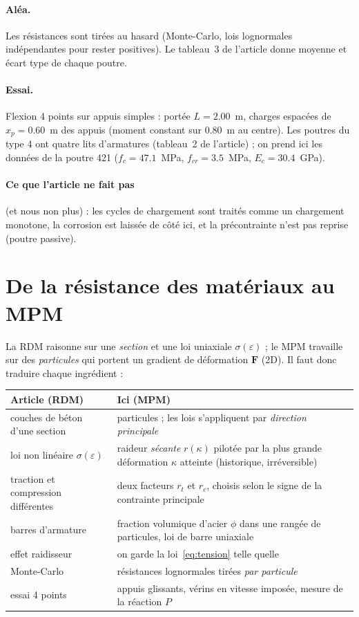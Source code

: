 \documentclass[11pt,a4paper]{article}
\begin{document}
\paragraph{Aléa.} Les résistances sont tirées au hasard (Monte-Carlo, lois lognormales
indépendantes pour rester positives). Le tableau~3 de l'article donne moyenne et écart type de
chaque poutre.

\paragraph{Essai.} Flexion 4 points sur appuis simples : portée $L = 2.00$~m, charges espacées de
$x_p = 0.60$~m des appuis (moment constant sur $0.80$~m au centre). Les poutres du type 4 ont
quatre lits d'armatures (tableau~2 de l'article) ; on prend ici les données de la poutre 421
($f_c = 47.1$~MPa, $f_{cr} = 3.5$~MPa, $E_c = 30.4$~GPa).

\paragraph{Ce que l'article ne fait pas} (et nous non plus) : les cycles de chargement sont
traités comme un chargement monotone, la corrosion est laissée de côté ici, et la précontrainte n'est
pas reprise (poutre passive).

\section{De la résistance des matériaux au MPM}

La RDM raisonne sur une \emph{section} et une loi uniaxiale $\sigma(\varepsilon)$ ; le MPM travaille
sur des \emph{particules} qui portent un gradient de déformation $\mathbf F$ (2D). Il faut donc
traduire chaque ingrédient :

\begin{center}
\begin{tabular}{@{}p{5.3cm}p{9.5cm}@{}}
\toprule
Article (RDM) & Ici (MPM) \\
\midrule
couches de béton d'une section & particules ; les lois s'appliquent par \emph{direction principale} \\
loi non linéaire $\sigma(\varepsilon)$ & raideur \emph{sécante} $r(\kappa)$ pilotée par la plus grande déformation $\kappa$ atteinte (historique, irréversible) \\
traction et compression différentes & deux facteurs $r_t$ et $r_c$, choisis selon le signe de la contrainte principale \\
barres d'armature & fraction volumique d'acier $\phi$ dans une rangée de particules, loi de barre uniaxiale \\
effet raidisseur & on garde la loi~\eqref{eq:tension} telle quelle \\
Monte-Carlo & résistances lognormales tirées \emph{par particule} \\
essai 4 points & appuis glissants, vérins en vitesse imposée, mesure de la réaction $P$ \\
\bottomrule
\end{tabular}
\end{center}
\end{document}

